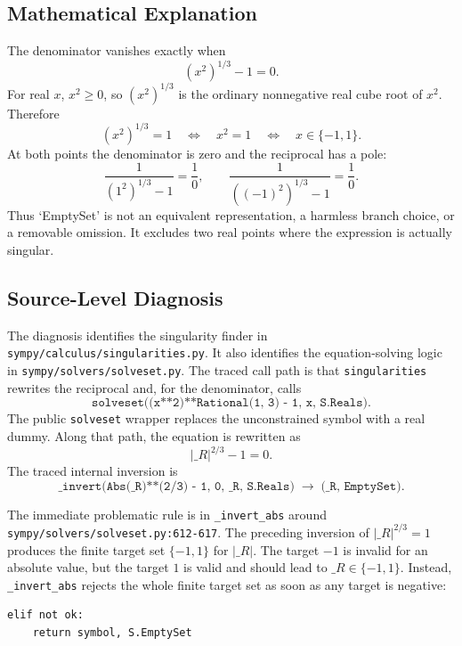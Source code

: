 \documentclass[11pt]{article}
\begin{document}
\subsection{Mathematical Explanation}

The denominator vanishes exactly when
\[
    (x^2)^{1/3}-1=0.
\]
For real \(x\), \(x^2\ge 0\), so \((x^2)^{1/3}\) is the ordinary nonnegative
real cube root of \(x^2\). Therefore
\[
    (x^2)^{1/3}=1
    \quad\Longleftrightarrow\quad
    x^2=1
    \quad\Longleftrightarrow\quad
    x\in\{-1,1\}.
\]
At both points the denominator is zero and the reciprocal has a pole:
\[
    \frac{1}{(1^2)^{1/3}-1}=\frac{1}{0},\qquad
    \frac{1}{((-1)^2)^{1/3}-1}=\frac{1}{0}.
\]
Thus `EmptySet' is not an equivalent representation, a harmless branch choice,
or a removable omission. It excludes two real points where the expression is
actually singular.

\subsection{Source-Level Diagnosis}

The diagnosis identifies the singularity finder in
\nolinkurl{sympy/calculus/singularities.py}. It also identifies the
equation-solving logic in \nolinkurl{sympy/solvers/solveset.py}. The traced
call path is that \texttt{singularities} rewrites the reciprocal and, for the
denominator, calls
\[
    \texttt{solveset((x**2)**Rational(1, 3) - 1, x, S.Reals)}.
\]
The public \texttt{solveset} wrapper replaces the unconstrained symbol with a
real dummy. Along that path, the equation is rewritten as
\[
    |\_R|^{2/3}-1=0.
\]
The traced internal inversion is
\[
    \texttt{\_invert(Abs(\_R)**(2/3) - 1, 0, \_R, S.Reals)}
    \;\longrightarrow\; \texttt{(\_R, EmptySet)}.
\]

The immediate problematic rule is in \texttt{\_invert\_abs} around
\nolinkurl{sympy/solvers/solveset.py:612-617}. The preceding inversion of
\(|\_R|^{2/3}=1\) produces the finite target set \(\{-1,1\}\) for
\(|\_R|\). The target \(-1\) is invalid for an absolute value, but the target
\(1\) is valid and should lead to \(\_R\in\{-1,1\}\). Instead,
\texttt{\_invert\_abs} rejects the whole finite target set as soon as any target
is negative:

\medskip

\begin{lstlisting}[style=bugpython]
elif not ok:
    return symbol, S.EmptySet
\end{lstlisting}
\end{document}
